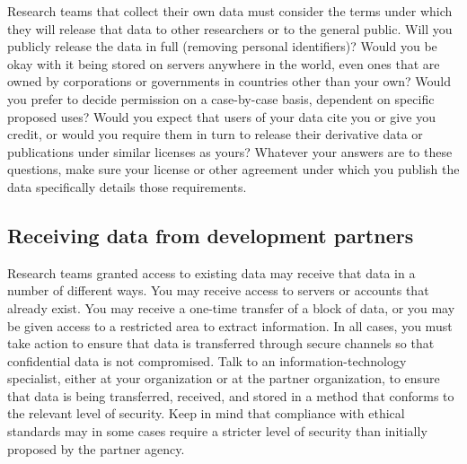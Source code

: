 Research teams that collect their own data must consider the terms
under which they will release that data to other researchers or to the general public. 
Will you publicly release the data in full (removing personal identifiers)?
Would you be okay with it being stored on servers anywhere in the world,
even ones that are owned by corporations or governments in countries other than your own?
Would you prefer to decide permission on a case-by-case basis, dependent on specific proposed uses? 
Would you expect that users of your data cite you or give you credit,
or would you require them in turn to release
their derivative data or publications under similar licenses as yours?
Whatever your answers are to these questions,
make sure your license or other agreement
under which you publish the data
specifically details those requirements.


\subsection{Receiving data from development partners}

Research teams granted access to existing data may receive that data in a number of different ways.
You may receive access to servers or accounts that already exist.
You may receive a one-time transfer of a block of data,
or you may be given access to a restricted area to extract information.
In all cases, you must take action to ensure that data is transferred through 
secure channels so that confidential data is not compromised.
Talk to an information-technology specialist,
either at your organization or at the partner organization,
to ensure that data is being transferred, received, and stored
in a method that conforms to the relevant level of security.
Keep in mind that compliance with ethical standards may 
in some cases require a stricter level of security than initially proposed by the partner agency.

